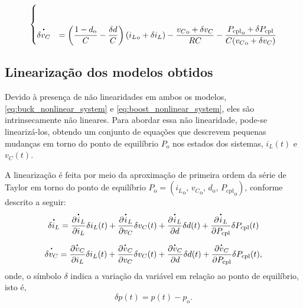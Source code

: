 \begin{equation}
\begin{cases}
    \\[12pt]
    
    \dt{\delta {v}_C} &= \displaystyle \left( \frac{1 - d_{\mathrm{o}}}{C} - \frac{\delta d}{C} \right)\left({i_L}_{\mathrm{o}} + \delta i_L\right) - \frac{{v_C}_{\mathrm{o}} + \delta v_C}{RC} - \frac{{{P_{\mathrm{cpl}}}_{\mathrm{o}} + \delta P_{\mathrm{cpl}}}}{C({v_C}_{\mathrm{o}} + \delta {v_C})}
  \end{cases}
\end{equation} 
\vspace{1pt}

\subsection{Linearização dos modelos obtidos}

Devido à presença de não linearidades em ambos os modelos, \eqref{eq:buck_nonlinear_system} e \eqref{eq:boost_nonlinear_system}, eles são intrinsecamente não lineares. Para abordar essa não linearidade, pode-se linearizá-los, obtendo um conjunto de equações que descrevem pequenas mudanças em torno do ponto de equilíbrio $P_{\mathrm{o}}$ nos estados dos sistemas, $i_L(t)$ e $v_C(t)$.

A linearização é feita por meio da aproximação de primeira ordem da série de Taylor em torno do ponto de equilíbrio $P_{\mathrm{o}} = ({i_L}_{\mathrm{o}}, \, {v_C}_{\mathrm{o}}, \, {d}_{\mathrm{o}}, \, {P_{\mathrm{cpl}}}_{\mathrm{o}})$, conforme descrito a seguir: \begin{gather}  \dt{\delta i_L} = \frac{\partial \dt{i}_L}{\partial i_L}\delta i_L(t) + \frac{\partial \dt{i}_L}{\partial v_C}\delta v_C(t) + \frac{\partial {\dt{i}_L}}{\partial d}\delta d(t) + \frac{\partial {\dt{i}_L}}{\partial P_{\mathrm{cpl}}}\delta P_{\mathrm{cpl}}(t) \\ \nonumber \\ \dt{\delta v_C} = \frac{\partial \dt{v}_C}{\partial i_L}\delta i_L(t) + \frac{\partial \dt{v}_C}{\partial v_C}\delta v_C(t) + \frac{\partial \dt{v}_C}{\partial d}\delta d(t) + \frac{\partial \dt{v}_C}{\partial P_{\mathrm{cpl}}}\delta P_{\mathrm{cpl}}(t), \end{gather} onde, o símbolo $\delta$ indica a variação da variável em relação ao ponto de equilíbrio, isto é, \begin{equation} \delta p(t) = p(t) - p_{\mathrm{o}}. \label{eq:delta}\end{equation}

